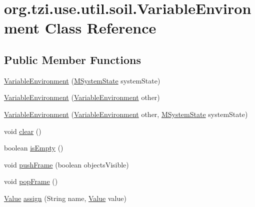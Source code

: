 \hypertarget{classorg_1_1tzi_1_1use_1_1util_1_1soil_1_1_variable_environment}{\section{org.\-tzi.\-use.\-util.\-soil.\-Variable\-Environment Class Reference}
\label{classorg_1_1tzi_1_1use_1_1util_1_1soil_1_1_variable_environment}
}
\subsection*{Public Member Functions}
\begin{DoxyCompactItemize}
\item 
\hyperlink{classorg_1_1tzi_1_1use_1_1util_1_1soil_1_1_variable_environment_a6bddcdac6008ec4853885bd1146c35bc}{Variable\-Environment} (\hyperlink{classorg_1_1tzi_1_1use_1_1uml_1_1sys_1_1_m_system_state}{M\-System\-State} system\-State)
\item 
\hyperlink{classorg_1_1tzi_1_1use_1_1util_1_1soil_1_1_variable_environment_a97e8b5b86df6cdb22d1a09329df6d459}{Variable\-Environment} (\hyperlink{classorg_1_1tzi_1_1use_1_1util_1_1soil_1_1_variable_environment}{Variable\-Environment} other)
\item 
\hyperlink{classorg_1_1tzi_1_1use_1_1util_1_1soil_1_1_variable_environment_a47a2e82af1923fb48a692f77c1a90f97}{Variable\-Environment} (\hyperlink{classorg_1_1tzi_1_1use_1_1util_1_1soil_1_1_variable_environment}{Variable\-Environment} other, \hyperlink{classorg_1_1tzi_1_1use_1_1uml_1_1sys_1_1_m_system_state}{M\-System\-State} system\-State)
\item 
void \hyperlink{classorg_1_1tzi_1_1use_1_1util_1_1soil_1_1_variable_environment_afcd41ae071147b99c1522c804ce4f4e8}{clear} ()
\item 
boolean \hyperlink{classorg_1_1tzi_1_1use_1_1util_1_1soil_1_1_variable_environment_a5343ca6e80610c68335e8303d4c44383}{is\-Empty} ()
\item 
void \hyperlink{classorg_1_1tzi_1_1use_1_1util_1_1soil_1_1_variable_environment_ac20999217742853d31750e4303bbaa79}{push\-Frame} (boolean objects\-Visible)
\item 
void \hyperlink{classorg_1_1tzi_1_1use_1_1util_1_1soil_1_1_variable_environment_a676e1e564c35d3fc45bcb0bb025a9190}{pop\-Frame} ()
\item 
\hyperlink{classorg_1_1tzi_1_1use_1_1uml_1_1ocl_1_1value_1_1_value}{Value} \hyperlink{classorg_1_1tzi_1_1use_1_1util_1_1soil_1_1_variable_environment_a2d5a1e2e66636947e3b3ca3dc64eb41a}{assign} (String name, \hyperlink{classorg_1_1tzi_1_1use_1_1uml_1_1ocl_1_1value_1_1_value}{Value} value)

\end{DoxyCompactItemize}
